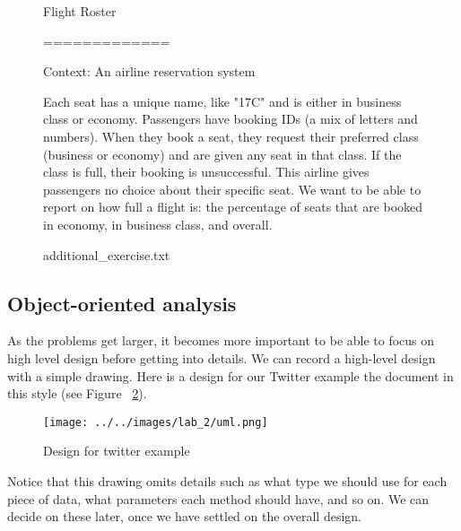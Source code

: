 \documentclass[12pt]{article}
\begin{document}
\begin{figure}
\begin{mdframed}
        \bigskip

        Flight Roster

        =============

        \bigskip

        Context: An airline reservation system

        \bigskip

        Each seat has a unique name, like "17C" and is either in business class or
        economy. Passengers have booking IDs (a mix of letters and numbers). When they
        book a seat, they request their preferred class (business or economy) and are
        given any seat in that class. If the class is full, their booking is
        unsuccessful. This airline gives passengers no choice about their specific seat.
        We want to be able to report on how full a flight is: the percentage of seats
        that are booked in economy, in business class, and overall.

    \end{mdframed}
    \caption{additional\_exercise.txt}
    \label{fig:additionalExercise}
\end{figure}

\bigskip

\subsection*{Object-oriented analysis}
As the problems get larger, it becomes more important to be able to focus on high
level design before getting into details. We can record a high-level design with
a simple drawing. Here is a design for our Twitter example the document
in this style (see Figure ~\ref{fig:uml}).

\bigskip

\begin{figure}
    \begin{center}
    \texttt{[image: ../../images/lab\_2/uml.png]}
    \end{center}
    \caption{Design for twitter example}
    \label{fig:uml}
\end{figure}

\bigskip

\noindent Notice that this drawing omits details such as what type we should use for each
piece of data, what parameters each method should have, and so on. We can decide
on these later, once we have settled on the overall design.
\end{document}
